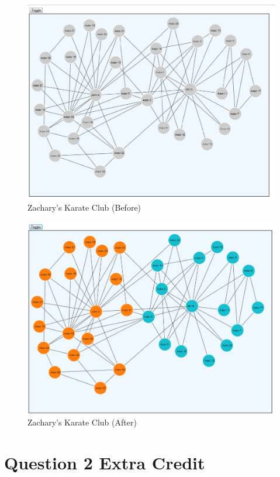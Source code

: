 \documentclass[letterpaper,11pt]{report}
\begin{document}
\begin{savenotes}
\begin{figure}[htbp]
	\centering
		\includegraphics[width=1.00\textwidth]{karate-before.png}
	\caption{Zachary's Karate Club (Before)}
	\label{fig:karate-before}
\end{figure}


\begin{figure}[htbp]
	\centering
		\includegraphics[width=1.00\textwidth]{karate-after.png}
	\caption{Zachary's Karate Club (After)}
	\label{fig:karate-after}
\end{figure}


\section{Question 2 Extra Credit}

\end{savenotes}
\end{document}
